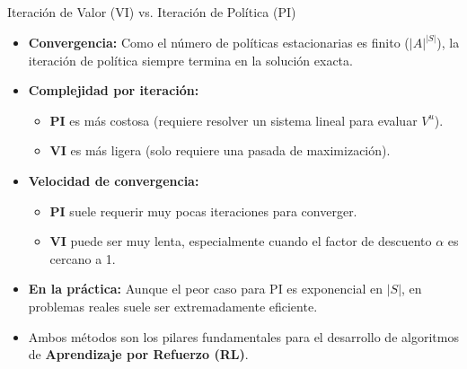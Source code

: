 \documentclass[xcolor=dvipsnames]{beamer}
\begin{document}
\begin{frame}{Iteraci\'on de Valor (VI) vs. Iteraci\'on de Pol\'itica (PI)}
\begin{itemize}
    \item \textbf{Convergencia:} Como el n\'umero de pol\'iticas estacionarias es finito ($|A|^{|S|}$), la iteraci\'on de pol\'itica siempre termina en la soluci\'on exacta.

    \item<2-> \textbf{Complejidad por  iteraci\'on:} 
    \begin{itemize}
        \item \textbf{PI} es m\'as costosa (requiere resolver un sistema lineal para evaluar $V^u$).
        \item \textbf{VI} es m\'as ligera (solo requiere una pasada de maximizaci\'on).
    \end{itemize}

    \item<3-> \textbf{Velocidad de convergencia:}
    \begin{itemize}
        \item \textbf{PI} suele requerir muy pocas iteraciones para converger.
        \item \textbf{VI} puede ser muy lenta, especialmente cuando el factor de descuento $\alpha$ es cercano a 1.
    \end{itemize}

    \item<4-> \textbf{En la pr\'actica:} Aunque el peor caso para PI es exponencial en $|S|$, en problemas reales suele ser extremadamente eficiente.

    \item<5-> Ambos m\'etodos son los pilares fundamentales para el desarrollo de algoritmos de \textbf{Aprendizaje por Refuerzo (RL)}.
\end{itemize}
\end{frame}
\end{document}
